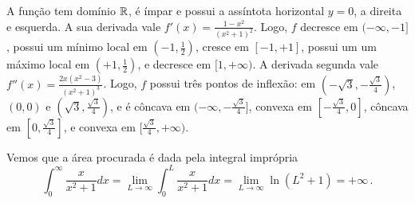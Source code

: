 \begin{Solution}{11.3}
A função tem domínio $\mathbb{R}$, é ímpar e possui a assíntota horizontal
$y=0$, a
direita e esquerda.
A sua derivada vale $f'(x)=\frac{1-x^2}{(x^2+1)^2}$. Logo, $f$ decresce em
$(-\infty,-1]$, possui um mínimo local em $(-1,\tfrac{1}{2})$, cresce em
$[-1,+1]$, possui um
um máximo local em $(+1,\tfrac{1}{2})$, e decresce em $[1,+\infty)$.
A derivada segunda vale $f''(x)=\frac{2x(x^2-3)}{(x^2+1)^3}$. Logo, $f$ possui
três pontos de inflexão: em $(-\sqrt{3},-\frac{\sqrt{3}}{4})$,
$(0,0)$ e $(\sqrt{3},\frac{\sqrt{3}}{4})$, e é côncava em
$(-\infty,-\frac{\sqrt{3}}{4}]$, convexa em $[-\tfrac{\sqrt{3}}{4},0]$, côncava
em $[0,\tfrac{\sqrt{3}}{4}]$, e convexa em
$[\tfrac{\sqrt{3}}{4},+\infty)$.
\begin{center}
\begin{bmlimage}\end{bmlimage}
\end{center}
Vemos que a área procurada é dada pela integral imprópria
$$
\int_0^\infty\frac{x}{x^2+1}dx=\lim_{L\to\infty}\int_0^L\frac{x}{x^2+1}dx=\lim_{
L\to\infty} \ln (L^2+1)=+\infty\,.
$$
\end{Solution}
